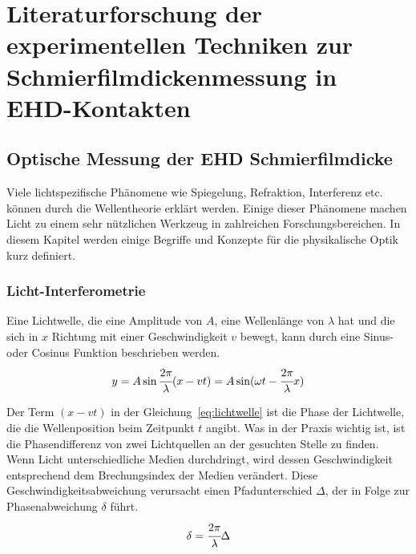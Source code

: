 \chapter{Literaturforschung der experimentellen Techniken zur Schmierfilmdickenmessung in EHD-Kontakten}
\label{chap:literaturforschung_der_experimentellen_technik_in_ehd_schmierung}

\section{Optische Messung der EHD Schmierfilmdicke}
\label{sec:optische_messung_der_ehd_schmierfilmdicke}

Viele lichtspezifische Phänomene wie Spiegelung, Refraktion, Interferenz etc. können durch die Wellentheorie erklärt werden.
Einige dieser Phänomene machen Licht zu einem sehr nützlichen Werkzeug in zahlreichen Forschungsbereichen.
In diesem Kapitel werden einige Begriffe und Konzepte für die physikalische Optik kurz definiert.

\subsection{Licht-Interferometrie}
\label{ssec:licht_interferometrie}

Eine Lichtwelle, die eine Amplitude von $A$, eine Wellenlänge von $\lambda$ hat und die sich in $x$ Richtung mit einer Geschwindigkeit $v$ bewegt, kann durch eine Sinus- oder Cosinus Funktion beschrieben werden.
\begin{equation}
        y = A \sin \cfrac{2 \pi}{\lambda} (x - v t) = A \sin (\omega t - \cfrac{2 \pi}{\lambda} x)
    \label{eq:lichtwelle}
\end{equation}
%

Der Term $(x - v t)$ in der Gleichung~\ref{eq:lichtwelle} ist die Phase der Lichtwelle, die die Wellenposition beim Zeitpunkt $t$ angibt.
Was in der Praxis wichtig ist, ist die Phasendifferenz von zwei Lichtquellen an der gesuchten Stelle zu finden.
Wenn Licht unterschiedliche Medien durchdringt, wird dessen Geschwindigkeit entsprechend dem Brechungsindex der Medien verändert.
Diese Geschwindigkeitsabweichung verursacht einen Pfadunterschied $\Delta$, der in Folge zur Phasenabweichung $\delta$ führt.
\begin{equation}
    \delta = \cfrac{2 \pi}{\lambda} \Delta
    \label{eq:licht_phasenabweichung}
\end{equation}
%

